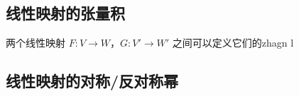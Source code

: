 
\begin{issues}
\issueDraft
{}
\end{issues}

\subsection{线性映射的张量积}

两个线性映射 $F: V \to W$，$G: V' \to W'$ 之间可以定义它们的zhagn l



\subsection{线性映射的对称/反对称幂}

